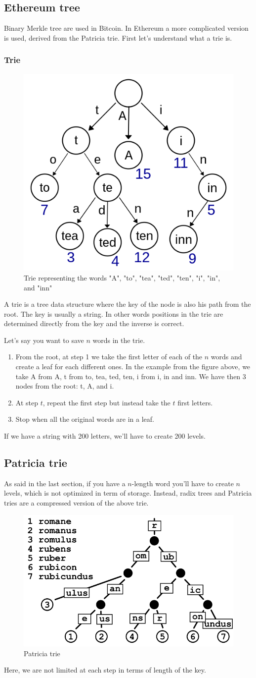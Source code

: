 \subsection{Ethereum tree}
Binary Merkle tree are used in Bitcoin. 
In Ethereum a more complicated version is used, derived from the Patricia trie. First let's understand what a trie is. 
\subsubsection{Trie}
\begin{figure}[H]
    \centering
\includegraphics[width=0.3\linewidth]{background/trie.png}
    \caption{Trie representing the words "A", "to", "tea", "ted", "ten", "i", "in", and "inn"}
    \label{fig:trie}
\end{figure}
A trie is a tree data structure where the key of the node is also his path from the root. The key is usually a string.
In other words positions in the trie are determined directly from the key and the inverse is correct. 

Let's say you want to save $n$ words in the trie.
\begin{enumerate}
    \item From the root, at step 1 we take the first letter of each of the $n$ words and create a leaf for each different ones. In the example from the figure above, we  take A from A, t from to, tea, ted, ten, i from i, in and inn. We have then 3 nodes from the root: t, A, and i.
    \item At step $t$, repeat the first step but instead take the $t$ first letters. 
    \item Stop when all the original words are in a leaf. 
\end{enumerate}
If we have a string with 200 letters, we'll have to create 200 levels.
\subsection{Patricia trie}
As said in the last section, if you have a $n$-length word you'll have to create $n$ levels, which is not optimized in term of storage. 
Instead, radix trees and Patricia tries are a compressed version of the above trie.
\begin{figure}[H]
    \centering
\includegraphics[width=0.4\linewidth]{background/patricia.png}
    \caption{Patricia trie}
    \label{fig:patricia}
\end{figure}
Here, we are not limited at each step in terms of length of the key.

